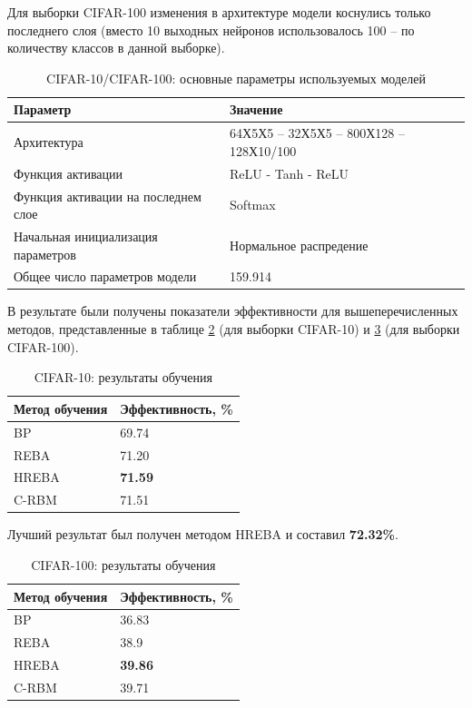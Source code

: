Для выборки CIFAR-100 изменения в архитектуре модели коснулись только последнего слоя (вместо 10 выходных нейронов использовалось 100 -- по количеству классов в данной выборке).

\begin{table}[!h]
    \caption{CIFAR-10/CIFAR-100: основные параметры используемых моделей}\label{table:cifar_comparison_params}
    \begin{tabular}{|p{7cm}|p{8cm}|}
        \hline
        \textbf{Параметр} & \textbf{Значение}\\
        \hline
        Архитектура & 64Х5Х5 -- 32Х5Х5 -- 800Х128 -- 128Х10/100\\
        \hline
        Функция активации & ReLU - Tanh - ReLU \\
        \hline
        Функция активации на последнем слое & Softmax \\
        \hline
        Начальная инициализация параметров & Нормальное распредение \\
        \hline
        Общее число параметров модели & 159.914
        \\
        \hline
    \end{tabular}
\end{table}

В результате были получены показатели эффективности для вышеперечисленных методов, представленные в таблице \ref{table:cifar_10_results} (для выборки CIFAR-10) и \ref{table:cifar_100_results} (для выборки CIFAR-100).

\begin{table} [!h]
  \centering
  \caption{CIFAR-10: результаты обучения}\label{table:cifar_10_results}
  \begin{tabular}{| p{6cm} | p{6cm} |}
    \hline
      \textbf{Метод обучения} & \textbf{Эффективность, \%}\\
      \hline
      BP & 69.74\\
      \hline
      REBA & 71.20\\
      \hline
      HREBA & \textbf{71.59}\\
      \hline
      C-RBM & 71.51\\
      \hline
  \end{tabular}
\end{table}

Лучший результат был получен методом HREBA и составил \textbf{72.32\%}.

\begin{table} [!h]
  \centering
  \caption{CIFAR-100: результаты обучения}\label{table:cifar_100_results}
  \begin{tabular}{| p{6cm} | p{6cm} |}
    \hline
      \textbf{Метод обучения} & \textbf{Эффективность, \%}\\
      \hline
      BP & 36.83\\
      \hline
      REBA & 38.9\\
      \hline
      HREBA & \textbf{39.86}\\
      \hline
      C-RBM & 39.71\\
      \hline
  \end{tabular}
\end{table}

